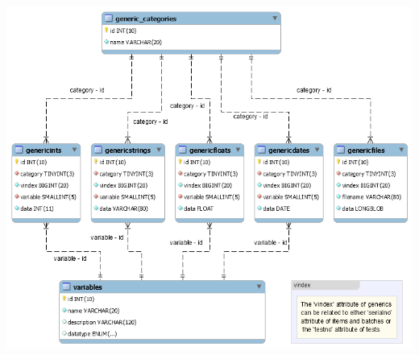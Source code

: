 \begin{appendices}
	\includegraphics[width=1.0\textwidth]{img/mysql_schema_variables.png}
\end{appendices}
